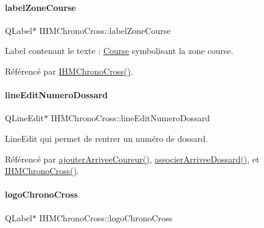 \paragraph{\texorpdfstring{label\+Zone\+Course}{labelZoneCourse}}
{\footnotesize\ttfamily Q\+Label$\ast$ I\+H\+M\+Chrono\+Cross\+::label\+Zone\+Course\hspace{0.3cm}{\ttfamily [private]}}



Label contenant le texte \+: \hyperlink{class_course}{Course} symbolisant la zone course. 



Référencé par \hyperlink{class_i_h_m_chrono_cross_a479fc90733fba3e65fb06aa4a3adc02e}{I\+H\+M\+Chrono\+Cross()}.

\mbox{\label{class_i_h_m_chrono_cross_ad2e156ff9412644debf8da7a3ec1566d}} 
\paragraph{\texorpdfstring{line\+Edit\+Numero\+Dossard}{lineEditNumeroDossard}}
{\footnotesize\ttfamily Q\+Line\+Edit$\ast$ I\+H\+M\+Chrono\+Cross\+::line\+Edit\+Numero\+Dossard\hspace{0.3cm}{\ttfamily [private]}}



Line\+Edit qui permet de rentrer un numéro de dossard. 



Référencé par \hyperlink{class_i_h_m_chrono_cross_a2ce63851d1f2723057ac649b7e320cfe}{ajouter\+Arrivee\+Coureur()}, \hyperlink{class_i_h_m_chrono_cross_a9f7f1ad130b60300a879694b6234f161}{associer\+Arrivee\+Dossard()}, et \hyperlink{class_i_h_m_chrono_cross_a479fc90733fba3e65fb06aa4a3adc02e}{I\+H\+M\+Chrono\+Cross()}.

\mbox{\label{class_i_h_m_chrono_cross_a76f2f83c624da73e3d3de6a8b4ff43a1}} 
\paragraph{\texorpdfstring{logo\+Chrono\+Cross}{logoChronoCross}}
{\footnotesize\ttfamily Q\+Label$\ast$ I\+H\+M\+Chrono\+Cross\+::logo\+Chrono\+Cross\hspace{0.3cm}{\ttfamily [private]}}



